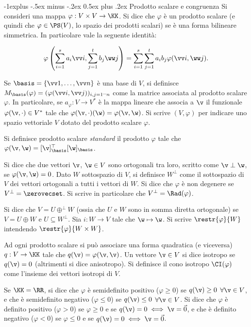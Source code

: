 \documentclass[10pt,landscape]{article}
\makeatletter
\renewcommand{\subsection}{\@startsection{subsection}{2}{0mm}%
	{-1explus -.5ex minus -.2ex}%
	{0.5ex plus .2ex}%
	{\normalfont\normalsize\bfseries}}
\makeatother
\begin{document}
\begin{multicols}{3}
		\subsection{Prodotto scalare e congruenza}
		Si consideri una mappa $\varphi : V \times V \to \KK$. Si dice che
		$\varphi$ è un prodotto scalare (e quindi che $\varphi \in \PS(V)$, lo spazio dei prodotti scalari) se è una forma bilineare simmetrica.
		In particolare vale la seguente identità:
		
		\[ \varphi\left( \sum_{i=1}^s a_i \vv i, \sum_{j=1}^t b_j \ww j \right) =
		\sum_{i=1}^s  \sum_{j=1}^t a_i b_j \varphi(\vv i, \ww j). \]
		
		Se $\basis = \{ \vv 1, \ldots ,\vv n \}$ è una base di $V$, si definisce $M_\basis(\varphi) = (\varphi(\vv i, \vv j))_{i,j=1\mbox{--}n}$ come la matrice associata al prodotto scalare $\varphi$. In particolare,
		se $a_\varphi : V \to V^*$ è la mappa lineare che associa a $\v$ il funzionale $\varphi(\v, \cdot) \in V^*$
		tale che $\varphi(\v, \cdot)(\w) = \varphi(\v, \w)$. Si scrive $(V, \varphi)$ per indicare uno
		spazio vettoriale $V$ dotato del prodotto scalare $\varphi$.
		
		Si definisce prodotto scalare \textit{standard} il prodotto $\varphi$ tale che
		$\varphi(\v, \w) = [\v]_\basis^\top [\w]_\basis$.
		
		Si dice che due vettori $\v$, $\w \in V$ sono ortogonali tra loro, scritto come $\v \perp \w$, se
		$\varphi(\v, \w) = 0$. Dato $W$ sottospazio di $V$, si definisce $W^\perp$ come il sottospazio di $V$ dei vettori ortogonali a tutti i vettori di $W$. Si dice che $\varphi$ è non degenere se $V^\perp = \zerovecset$.
		Si scrive in particolare che $V^\perp = \Rad(\varphi)$.
		
		Si dice che $V = U \oplus^\perp W$ (ossia che $U$ e $W$ sono in somma diretta ortogonale) se $V = U \oplus W$ e $U \subseteq W^\perp$. Sia $i : W \to V$ tale che $\w \mapsto \w$. Si scrive $\restr{\varphi}{W}$ intendendo $\restr{\varphi}{W \times W}$.
		
		Ad ogni prodotto scalare si può associare una forma quadratica (e viceversa) $q : V \to \KK$ tale che
		$q(\v) = \varphi(\v, \v)$. Un vettore $\v \in V$ si dice isotropo se $q(\v) = 0$ (altrimenti si dice
		anisotropo). Si definisce il cono isotropo $\CI(\varphi)$ come l'insieme dei vettori isotropi di $V$.
		
		Se $\KK = \RR$, si dice che $\varphi$ è semidefinito positivo ($\varphi \geq 0$) se $q(\v) \geq 0$ $\forall \v \in V$, e che è semidefinito negativo ($\varphi \leq 0$) se $q(\v) \leq 0$ $\forall \v \in V$. Si dice
		che $\varphi$ è definito positivo ($\varphi > 0$) se $\varphi \geq 0$ e se $q(\v) = 0 \iff \v = \vec 0$,
		e che è definito negativo ($\varphi < 0$) se $\varphi \leq 0$ e se $q(\v) = 0 \iff \v = \vec 0$.
		

\end{multicols}
\end{document}
